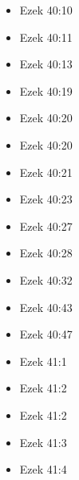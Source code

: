 \documentclass[14pt]{article}
\begin{document}
\begin{multicols}{2}
\begin{itemize}
														\item Ezek 40:10
														
														\item Ezek 40:11
														
														\item Ezek 40:13
														
														\item Ezek 40:19
														
														\item Ezek 40:20
														
														\item Ezek 40:20
														
														\item Ezek 40:21
														
														\item Ezek 40:23
														
														\item Ezek 40:27
														
														\item Ezek 40:28
														
														\item Ezek 40:32
														
														\item Ezek 40:43
														
														\item Ezek 40:47
														
														\item Ezek 41:1
														
														\item Ezek 41:2
														
														\item Ezek 41:2
														
														\item Ezek 41:3
														
														\item Ezek 41:4
														

\end{itemize}
\end{multicols}
\end{document}
